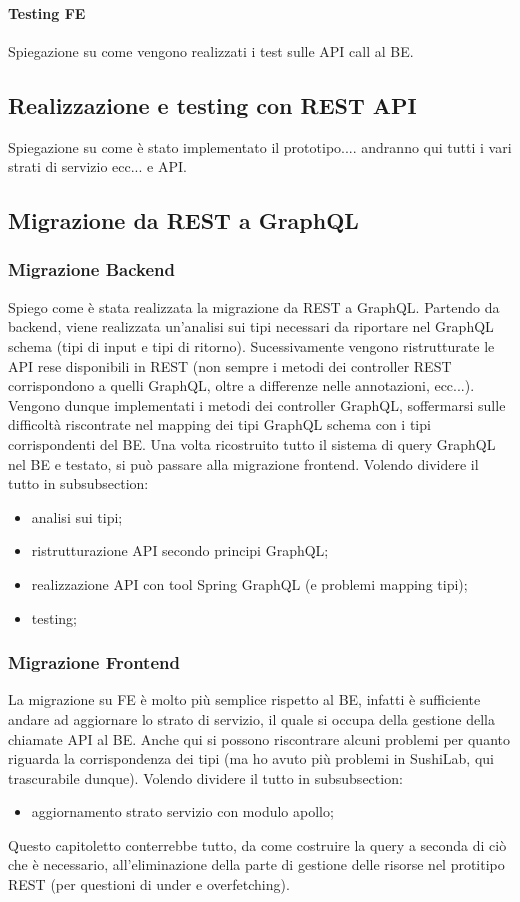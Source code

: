 \paragraph{Testing FE}
Spiegazione su come vengono realizzati i test sulle API call al BE.
\subsection{Realizzazione e testing con REST API}
Spiegazione su come è stato implementato il prototipo.... andranno qui tutti i vari strati di servizio ecc... e API.







\subsection{Migrazione da REST a GraphQL}
\subsubsection*{Migrazione Backend}
Spiego come è stata realizzata la migrazione da REST a GraphQL. Partendo da backend, viene realizzata un'analisi sui tipi necessari da riportare nel GraphQL schema (tipi di input e tipi di ritorno). Sucessivamente vengono ristrutturate le API rese disponibili in REST (non sempre i metodi dei controller REST corrispondono a quelli GraphQL, oltre a differenze nelle annotazioni, ecc...). Vengono dunque implementati i metodi dei controller GraphQL, soffermarsi sulle difficoltà riscontrate nel mapping dei tipi GraphQL schema con i tipi corrispondenti del BE. Una volta ricostruito tutto il sistema di query GraphQL nel BE e testato, si può passare alla migrazione frontend. Volendo dividere il tutto in subsubsection:
\begin{itemize}
  \item analisi sui tipi;
  \item ristrutturazione API secondo principi GraphQL;
  \item realizzazione API con tool Spring GraphQL (e problemi mapping tipi);
  \item testing;
\end{itemize}
\subsubsection*{Migrazione Frontend}
La migrazione su FE è molto più semplice rispetto al BE, infatti è sufficiente andare ad aggiornare lo strato di servizio, il quale si occupa della gestione della chiamate API al BE. Anche qui si possono riscontrare alcuni problemi per quanto riguarda la corrispondenza dei tipi (ma ho avuto più problemi in SushiLab, qui trascurabile dunque).
Volendo dividere il tutto in subsubsection:
\begin{itemize}
  \item aggiornamento strato servizio con modulo apollo;
\end{itemize}
Questo capitoletto conterrebbe tutto, da come costruire la query a seconda di ciò che è necessario, all'eliminazione della parte di gestione delle risorse nel protitipo REST (per questioni di under e overfetching).

